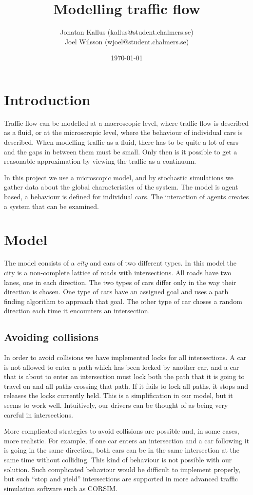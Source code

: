 \documentclass[11pt,a4paper]{article}
\author{Jonatan Kallus (kallus@student.chalmers.se)\\
Joel Wilsson (wjoel@student.chalmers.se)}
\date{\today}
\title{Modelling traffic flow}
\begin{document}
\maketitle

\section{Introduction}
Traffic flow can be modelled at a macroscopic level, where traffic flow is
described as a fluid, or at the microscropic level, where the behaviour of
individual cars is described. When modelling traffic as a fluid, there has
to be quite a lot of cars and the gaps in between them must be small. Only
then is it possible to get a reasonable approximation by viewing the traffic
as a continuum. \cite{gazis}

In this project we use a microscopic model, and by stochastic simulations
we gather data about the global characteristics of the system. The model is agent based, a behaviour is defined for individual cars. The interaction of agents creates a system that can be examined.

\section{Model}
The model consists of a \textit{city} and cars of two different types. In this model the city is a non-complete lattice of roads with intersections. All roads have two lanes, one in each direction. The two types of cars differ only in the way their direction is chosen. One type of cars have an assigned goal and uses a path finding algorithm to approach that goal. The other type of car choses a random direction each time it encounters an intersection.

\subsection{Avoiding collisions}
In order to avoid collisions we have implemented locks for all intersections.
A car is not allowed to enter a path which has been locked by another car,
and a car that is about to enter an intersection must lock both the path that
it is going to travel on and all paths crossing that path. If it fails to
lock all paths, it stops and releases the locks currently held. This is a
simplification in our model, but it seems to work well. Intuitively, our
drivers can be thought of as being very careful in intersections.

More complicated strategies to avoid collisions are possible and, in some
cases, more realistic. For example, if one car enters an intersection and
a car following it is going in the same direction, both cars can be in
the same intersection at the same time without colliding. This kind of
behaviour is not possible with our solution. Such complicated behaviour
would be difficult to implement properly, but such ``stop and yield''
intersections are supported in more advanced traffic simulation
software such as CORSIM. \cite{comparison}
\end{document}
